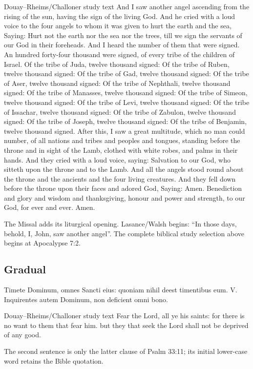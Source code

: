 \begin{englishwitness}{Douay--Rheims/Challoner study text}
And I saw another angel ascending from the rising of the sun, having the sign of the living God. And he cried with a loud voice to the four angels to whom it was given to hurt the earth and the sea, Saying: Hurt not the earth nor the sea nor the trees, till we sign the servants of our God in their foreheads. And I heard the number of them that were signed. An hundred forty-four thousand were signed, of every tribe of the children of Israel. Of the tribe of Juda, twelve thousand signed: Of the tribe of Ruben, twelve thousand signed: Of the tribe of Gad, twelve thousand signed: Of the tribe of Aser, twelve thousand signed: Of the tribe of Nephthali, twelve thousand signed: Of the tribe of Manasses, twelve thousand signed: Of the tribe of Simeon, twelve thousand signed: Of the tribe of Levi, twelve thousand signed: Of the tribe of Issachar, twelve thousand signed: Of the tribe of Zabulon, twelve thousand signed: Of the tribe of Joseph, twelve thousand signed: Of the tribe of Benjamin, twelve thousand signed. After this, I saw a great multitude, which no man could number, of all nations and tribes and peoples and tongues, standing before the throne and in sight of the Lamb, clothed with white robes, and palms in their hands. And they cried with a loud voice, saying: Salvation to our God, who sitteth upon the throne and to the Lamb. And all the angels stood round about the throne and the ancients and the four living creatures. And they fell down before the throne upon their faces and adored God, Saying: Amen. Benediction and glory and wisdom and thanksgiving, honour and power and strength, to our God, for ever and ever. Amen.
\end{englishwitness}
The Missal adds its liturgical opening. Lasance/Walsh begins:
``In those days, behold, I, John, saw another angel”. The
complete biblical study selection above begins at Apocalypse 7:2.

\subsection{Gradual}
\label{proper-gradual}
\begin{latinproper}
Timete Dominum, omnes Sancti eius: quoniam nihil deest timentibus eum. V. Inquirentes autem Dominum, non deficient omni bono.
\end{latinproper}
\begin{englishwitness}{Douay--Rheims/Challoner study text}
Fear the Lord, all ye his saints: for there is no want to them that fear him. but they that seek the Lord shall not be deprived of any good.
\end{englishwitness}
The second sentence is only the latter clause of Psalm 33:11;
its initial lower-case word retains the Bible quotation.

